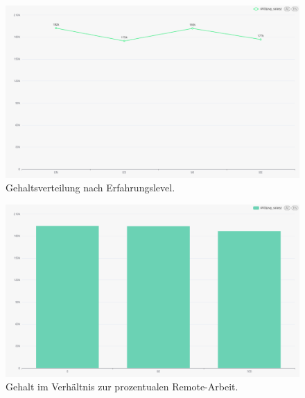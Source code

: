 \startAnhang

\listofanhang
\clearpage


\label{anhang:dockercompose}


\label{anhang:zusaetlichediagramme}
\label{anhang:1}
\begin{figure}[H]
  \centering
  \captionsetup{list=no} %
  \includegraphics[width=1\linewidth]{graphics/salary-distribution-by-experience-level-2025-01-19T14-55-24.076Z.jpg}
  \caption[Gehaltsverteilung nach Erfahrungslevel]{Gehaltsverteilung nach Erfahrungslevel.}
  \label{fig:chart3}
\end{figure}

\label{anhang:2}
\begin{figure}[H]
  \centering
  \captionsetup{list=no} %
  \includegraphics[width=0.8\linewidth]{graphics/salary-remote-ratio.jpg}
  \caption[Gehalt im Verhältnis zur prozentualen Remote-Arbeit]{Gehalt im Verhältnis zur prozentualen Remote-Arbeit.}
  \label{fig:Salary-Remote-Ratio}
\end{figure}

